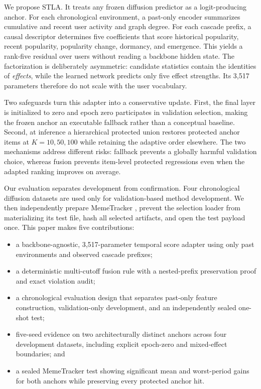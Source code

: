\documentclass[sigconf,anonymous,review]{acmart}
\newcommand{\method}{\textsc{STLA}\xspace}
\begin{document}
We propose \method. It treats any frozen diffusion predictor as a logit-producing anchor. For each chronological environment, a past-only encoder summarizes cumulative and recent user activity and graph degree. For each cascade prefix, a causal descriptor determines five coefficients that score historical popularity, recent popularity, popularity change, dormancy, and emergence. This yields a rank-five residual over users without reading a backbone hidden state. The factorization is deliberately asymmetric: candidate statistics contain the identities of \emph{effects}, while the learned network predicts only five effect strengths. Its 3,517 parameters therefore do not scale with the user vocabulary.

Two safeguards turn this adapter into a conservative update. First, the final layer is initialized to zero and epoch zero participates in validation selection, making the frozen anchor an executable fallback rather than a conceptual baseline. Second, at inference a hierarchical protected union restores protected anchor items at $K=10,50,100$ while retaining the adaptive order elsewhere. The two mechanisms address different risks: fallback prevents a globally harmful validation choice, whereas fusion prevents item-level protected regressions even when the adapted ranking improves on average.

Our evaluation separates development from confirmation. Four chronological diffusion datasets are used only for validation-based method development. We then independently prepare MemeTracker \cite{leskovec2009memetracking}, prevent the selection loader from materializing its test file, hash all selected artifacts, and open the test payload once. This paper makes five contributions:

\begin{itemize}[leftmargin=*,itemsep=1pt,topsep=2pt]
  \item a backbone-agnostic, 3,517-parameter temporal score adapter using only past environments and observed cascade prefixes;
  \item a deterministic multi-cutoff fusion rule with a nested-prefix preservation proof and exact violation audit;
  \item a chronological evaluation design that separates past-only feature construction, validation-only development, and an independently sealed one-shot test;
  \item five-seed evidence on two architecturally distinct anchors across four development datasets, including explicit epoch-zero and mixed-effect boundaries; and
  \item a sealed MemeTracker test showing significant mean and worst-period gains for both anchors while preserving every protected anchor hit.
\end{itemize}
\end{document}
